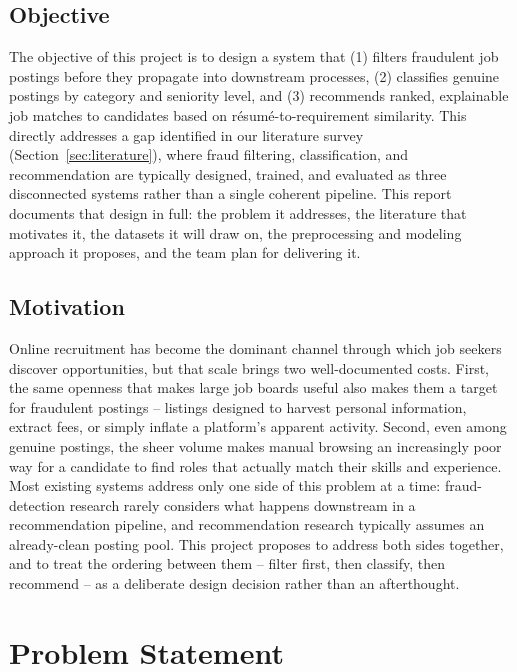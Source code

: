 \documentclass[11pt,a4paper]{article}
\begin{document}
\subsection*{Objective}
The objective of this project is to design a system that (1) filters fraudulent job
postings before they propagate into downstream processes, (2) classifies genuine
postings by category and seniority level, and (3) recommends ranked, explainable job
matches to candidates based on r\'esum\'e-to-requirement similarity. This directly
addresses a gap identified in our literature survey (Section~\ref{sec:literature}),
where fraud filtering, classification, and recommendation are typically designed,
trained, and evaluated as three disconnected systems rather than a single coherent
pipeline. This report documents that design in full: the problem it addresses, the
literature that motivates it, the datasets it will draw on, the preprocessing and
modeling approach it proposes, and the team plan for delivering it.

\subsection*{Motivation}
Online recruitment has become the dominant channel through which job seekers discover
opportunities, but that scale brings two well-documented costs. First, the same openness
that makes large job boards useful also makes them a target for fraudulent postings --
listings designed to harvest personal information, extract fees, or simply inflate a
platform's apparent activity. Second, even among genuine postings, the sheer volume makes
manual browsing an increasingly poor way for a candidate to find roles that actually
match their skills and experience. Most existing systems address only one side of this
problem at a time: fraud-detection research rarely considers what happens downstream in
a recommendation pipeline, and recommendation research typically assumes an
already-clean posting pool. This project proposes to address both sides together, and to
treat the ordering between them -- filter first, then classify, then recommend -- as a
deliberate design decision rather than an afterthought.

\section{Problem Statement}
\label{sec:problem}
\end{document}
